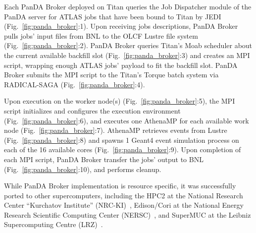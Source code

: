 Each PanDA Broker deployed on Titan queries the Job Dispatcher module of the
PanDA server for ATLAS jobs that have been bound to Titan by JEDI
(Fig.~\ref{fig:panda_broker}:1). Upon receiving jobs descriptions, PanDA
Broker pulls jobs' input files from BNL to the OLCF Lustre file system
(Fig.~\ref{fig:panda_broker}:2). PanDA Broker queries Titan's Moab scheduler
about the current available backfill slot (Fig.~\ref{fig:panda_broker}:3) and
creates an MPI script, wrapping enough ATLAS jobs' payload to fit the
backfill slot. PanDA Broker submits the MPI script to the Titan's Torque
batch system via RADICAL-SAGA (Fig.~\ref{fig:panda_broker}:4).

Upon execution on the worker node(s) (Fig.~\ref{fig:panda_broker}:5), the MPI
script initializes and configures the execution environment
(Fig.~\ref{fig:panda_broker}:6), and executes one AthenaMP for each available
work node (Fig.~\ref{fig:panda_broker}:7). AthenaMP retrieves events from
Lustre (Fig.~\ref{fig:panda_broker}:8) and spawns 1 Geant4 event simulation
process on each of the 16 available cores (Fig.~\ref{fig:panda_broker}:9).
Upon completion of each MPI script, PanDA Broker transfer the jobs' output to
BNL (Fig.~\ref{fig:panda_broker}:10), and performs cleanup.

While PanDA Broker implementation is resource specific, it was successfully
ported to other supercomputers, including the HPC2 at the National Research
Center ``Kurchatov Institute'' (NRC-KI)~\cite{belyaev2015integration},
Edison/Cori at the National Energy Research Scientific Computing Center
(NERSC)~\cite{barreiro2016panda}, and SuperMUC at the Leibniz Supercomputing
Centre (LRZ)~\cite{barreiro2016panda}.

